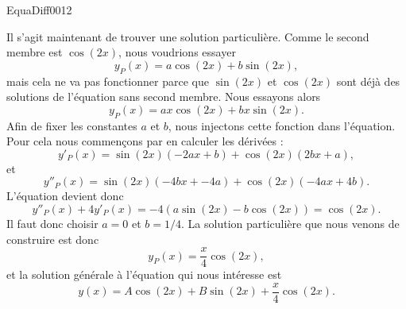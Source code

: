\begin{corrige}{EquaDiff0012}
\begin{enumerate}
			Il s'agit maintenant de trouver une solution particulière. Comme le second membre est $\cos(2x)$, nous voudrions essayer
			\begin{equation}
				y_P(x)=a\cos(2x)+b\sin(2x),
			\end{equation}
			mais cela ne va pas fonctionner parce que $\sin(2x)$ et $\cos(2x)$ sont déjà des solutions de l'équation sans second membre. Nous essayons alors
			\begin{equation}
				y_P(x)=ax\cos(2x)+bx\sin(2x).
			\end{equation}
			Afin de fixer les constantes $a$ et $b$, nous injectons cette fonction dans l'équation. Pour cela nous commençons par en calculer les dérivées :
			\begin{equation}
				y'_P(x)=\sin(2x)(-2ax+b)+\cos(2x)(2bx+a),
			\end{equation}
			et
			\begin{equation}
				y''_P(x)=\sin(2x)(-4bx+-4a)+\cos(2x)(-4ax+4b).
			\end{equation}
			L'équation devient donc
			\begin{equation}
				y''_P(x)+4y'_P(x)=-4(a\sin(2x)-b\cos(2x))=\cos(2x).
			\end{equation}
			Il faut donc choisir $a=0$ et $b=1/4$. La solution particulière que nous venons de construire est donc
			\begin{equation}
				y_P(x)=\frac{ x }{ 4 }\cos(2x),
			\end{equation}
			et la solution générale à l'équation qui nous intéresse est
			\begin{equation}
				y(x)=A\cos(2x)+B\sin(2x)+\frac{ x }{ 4 }\cos(2x).
			\end{equation}
		
	\end{enumerate}

\end{corrige}
